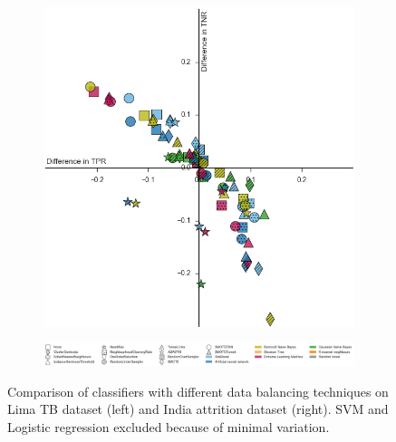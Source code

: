 \documentclass{sig-alternate-05-2015}
\begin{document}
\begin{figure}
\begin{subfigure}{.5\textwidth}
			\includegraphics[scale=0.61]{classifier_dataset_plt_2016-11-01_12-15-14}
		\end{subfigure}
		\vspace*{-0.5cm}\hspace*{-3cm}\begin{subfigure}{\textwidth}
			\includegraphics[scale=0.6]{legend}
		\end{subfigure}	
		\caption{Comparison of classifiers with different data balancing techniques on Lima TB dataset (left) and India attrition dataset (right). SVM and Logistic regression excluded because of minimal variation.}
		\label{fig:classifier_vs_balancer}
	\end{figure}
\end{document}
